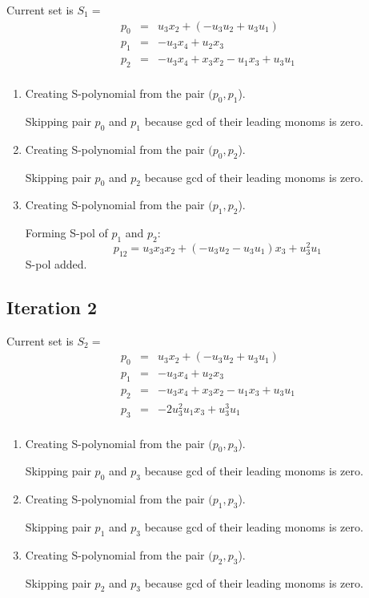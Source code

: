 \documentclass[a4paper]{article}
\begin{document}
Current set is $S_{1} = $\begin{eqnarray*}
p_{0} &=& u_{3}x_{2}+(-u_{3}u_{2}+u_{3}u_{1})\\
p_{1} &=& -u_{3}x_{4}+u_{2}x_{3}\\
p_{2} &=& -u_{3}x_{4}+x_{3}x_{2}-u_{1}x_{3}+u_{3}u_{1}\\
\end{eqnarray*}
\begin{enumerate}

\item Creating S-polynomial from the pair $(p_{0}, p_{1}$).

Skipping pair $p_{0}$ and $p_{1}$ because gcd of their leading monoms is zero.\item Creating S-polynomial from the pair $(p_{0}, p_{2}$).

Skipping pair $p_{0}$ and $p_{2}$ because gcd of their leading monoms is zero.\item Creating S-polynomial from the pair $(p_{1}, p_{2}$).

Forming S-pol of $p_{1}$ and $p_{2}$:$$
p_{12}  =  u_{3}x_{3}x_{2}+(-u_{3}u_{2}-u_{3}u_{1})x_{3}+u_{3}^{2}u_{1}
$$
S-pol added.\end{enumerate}





\subsection{Iteration 2}

Current set is $S_{2} = $\begin{eqnarray*}
p_{0} &=& u_{3}x_{2}+(-u_{3}u_{2}+u_{3}u_{1})\\
p_{1} &=& -u_{3}x_{4}+u_{2}x_{3}\\
p_{2} &=& -u_{3}x_{4}+x_{3}x_{2}-u_{1}x_{3}+u_{3}u_{1}\\
p_{3} &=& -2u_{3}^{2}u_{1}x_{3}+u_{3}^{3}u_{1}\\
\end{eqnarray*}
\begin{enumerate}

\item Creating S-polynomial from the pair $(p_{0}, p_{3}$).

Skipping pair $p_{0}$ and $p_{3}$ because gcd of their leading monoms is zero.\item Creating S-polynomial from the pair $(p_{1}, p_{3}$).

Skipping pair $p_{1}$ and $p_{3}$ because gcd of their leading monoms is zero.\item Creating S-polynomial from the pair $(p_{2}, p_{3}$).

Skipping pair $p_{2}$ and $p_{3}$ because gcd of their leading monoms is zero.\end{enumerate}
\end{document}
